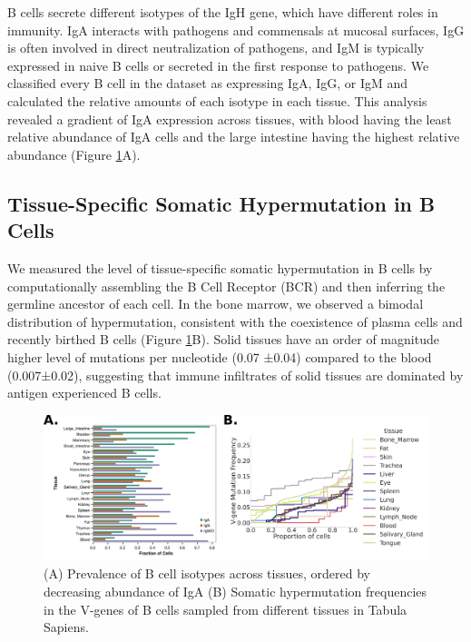 B cells secrete different isotypes of the IgH gene, which have different roles in immunity. IgA interacts with pathogens and commensals at mucosal surfaces, IgG is often involved in direct neutralization of pathogens, and IgM is typically expressed in naive B cells or secreted in the first response to pathogens. We classified every B cell in the dataset as expressing IgA, IgG, or IgM and calculated the relative amounts of each isotype in each tissue. This analysis revealed a gradient of IgA expression across tissues, with blood having the least relative abundance of IgA cells and the large intestine having the highest relative abundance (Figure \ref{fig:paper1_igh}A).

\subsection{Tissue-Specific Somatic Hypermutation in B Cells}

We measured the level of tissue-specific somatic hypermutation in B cells by computationally assembling the B Cell Receptor (BCR) and then inferring the germline ancestor of each cell\cite{lindeman2018bracer,gupta2015change}. In the bone marrow, we observed a bimodal distribution of hypermutation, consistent with the coexistence of plasma cells and recently birthed B cells (Figure \ref{fig:paper1_igh}B). Solid tissues have an order of magnitude higher level of mutations per nucleotide (0.07 ±0.04) compared to the blood (0.007±0.02), suggesting that immune infiltrates of solid tissues are dominated by antigen experienced B cells.

\begin{figure}[hbt!]
\centering
\includegraphics[width=14cm, keepaspectratio]{figs/paper1/fig3_tabula_igh.png}
\caption[Tissue population-level parameters of B cell Dynamics.]{(A) Prevalence of B cell isotypes across tissues, ordered by decreasing abundance of IgA (B) Somatic hypermutation frequencies in the V-genes of B cells sampled from different tissues in
Tabula Sapiens.}
\label{fig:paper1_igh}
\end{figure}


